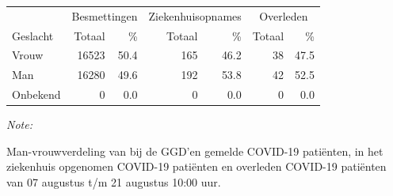 \documentclass[
  english,
  man,floatsintext]{apa6}
\begin{document}
\begin{table}
\centering\begingroup\fontsize{11}{13}\selectfont

\begin{threeparttable}
\begin{tabular}{lrrrrrr}
\toprule
\multicolumn{1}{c}{ } & \multicolumn{2}{c}{Besmettingen} & \multicolumn{2}{c}{Ziekenhuisopnames} & \multicolumn{2}{c}{Overleden} \\
\cmidrule(l{3pt}r{3pt}){2-3} \cmidrule(l{3pt}r{3pt}){4-5} \cmidrule(l{3pt}r{3pt}){6-7}
Geslacht & Totaal & \% & Totaal & \% & Totaal & \%\\
\midrule
Vrouw & 16523 & 50.4 & 165 & 46.2 & 38 & 47.5\\
Man & 16280 & 49.6 & 192 & 53.8 & 42 & 52.5\\
Onbekend & 0 & 0.0 & 0 & 0.0 & 0 & 0.0\\
\bottomrule
\end{tabular}
\begin{tablenotes}
\item \textit{Note: } 
\item Man-vrouwverdeling van bij de GGD’en gemelde COVID-19 patiënten, in het ziekenhuis opgenomen COVID-19 patiënten en overleden COVID-19 patiënten van 07 augustus t/m 21 augustus 10:00 uur.
\end{tablenotes}
\end{threeparttable}
\endgroup{}
\end{table}
\newpage
\end{document}
